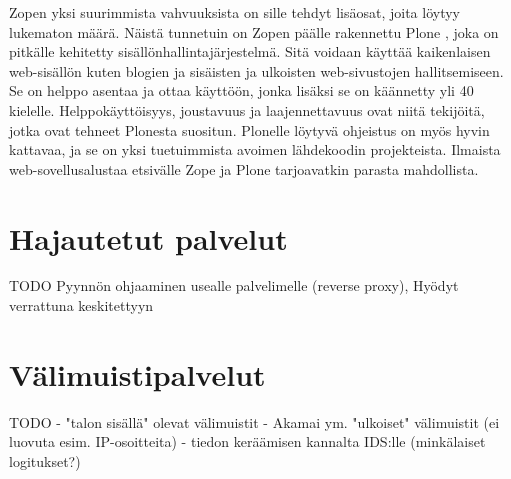 Zopen yksi suurimmista vahvuuksista on sille tehdyt lisäosat, joita löytyy lukematon määrä. Näistä tunnetuin on Zopen päälle rakennettu Plone \cite{Plone}, joka on pitkälle kehitetty 
sisällönhallintajärjestelmä. Sitä voidaan käyttää kaikenlaisen web-sisällön kuten blogien ja sisäisten ja ulkoisten web-sivustojen hallitsemiseen. Se on helppo asentaa ja ottaa käyttöön, 
jonka lisäksi se on käännetty yli 40 kielelle. Helppokäyttöisyys, joustavuus ja laajennettavuus ovat niitä tekijöitä, jotka ovat tehneet Plonesta suositun. Plonelle löytyvä ohjeistus
on myös hyvin kattavaa, ja se on yksi tuetuimmista avoimen lähdekoodin projekteista. Ilmaista web-sovellusalustaa etsivälle Zope ja Plone tarjoavatkin parasta mahdollista.

\section{Hajautetut palvelut}

TODO Pyynnön ohjaaminen usealle palvelimelle (reverse proxy), Hyödyt verrattuna keskitettyyn

\section{Välimuistipalvelut}

TODO 
- "talon sisällä" olevat välimuistit
 - Akamai ym. "ulkoiset" välimuistit (ei luovuta esim. IP-osoitteita)
 - tiedon keräämisen kannalta IDS:lle (minkälaiset logitukset?)

